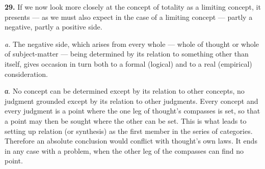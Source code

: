 \documentclass[12pt]{book}
\newcommand{\hnum}[1]{\textbf{#1.}\enspace}
\newcommand{\opage}[1]{\marginnote{\footnotesize\textit{[#1]}}}
\begin{document}
\hnum{29} If we now look more closely at the concept of totality as a limiting concept, it
presents --- as we must also expect in the case of a limiting concept --- partly a negative,
partly a positive side.

\textit{a.} The negative side, which arises from every whole --- whole of thought or whole
of subject-matter --- being determined by its relation to something other than itself, gives
occasion in turn both to a formal (logical) and to a real (empirical) consideration.

α. No concept can be determined except by its relation to other concepts, no judgment
grounded except by its relation to other judgments. Every concept and every judgment is a
point where the one leg of thought's compasses is set, so that a point may then be sought
where the other can be set. This is what leads to setting up relation (or synthesis) as the
first member in the series of categories. Therefore an \opage{76}absolute conclusion would conflict
with thought's own laws. It ends in any case with a problem, when the other leg of the
compasses can find no point.
\end{document}
